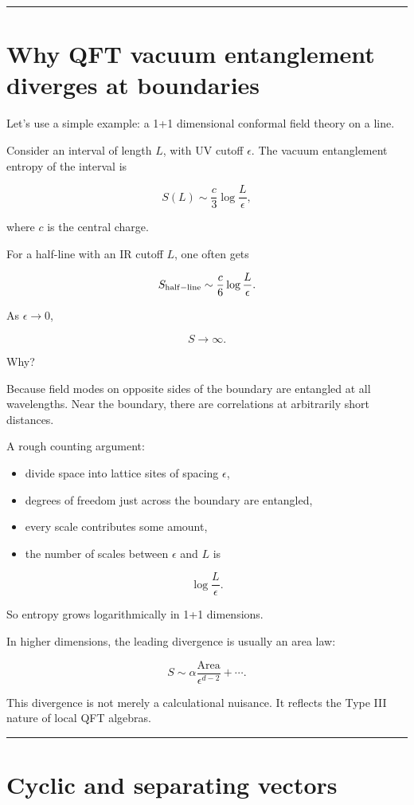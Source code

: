 \documentclass[11pt,a4paper]{article}
\begin{document}
\medskip\hrule\medskip

\section{Why QFT vacuum entanglement diverges at boundaries}

Let’s use a simple example: a 1+1 dimensional conformal field theory on a line.

Consider an interval of length $L$, with UV cutoff $\epsilon$. The vacuum entanglement entropy of the interval is

\[
S(L)\sim \frac{c}{3}\log\frac{L}{\epsilon},
\]

where $c$ is the central charge.

For a half-line with an IR cutoff $L$, one often gets

\[
S_{\rm half-line}\sim \frac{c}{6}\log\frac{L}{\epsilon}.
\]

As $\epsilon\to 0$,

\[
S\to \infty.
\]

Why?

Because field modes on opposite sides of the boundary are entangled at all wavelengths. Near the boundary, there are correlations at arbitrarily short distances.

A rough counting argument:

\begin{itemize}
  \item divide space into lattice sites of spacing $\epsilon$,
  \item degrees of freedom just across the boundary are entangled,
  \item every scale contributes some amount,
  \item the number of scales between $\epsilon$ and $L$ is
\end{itemize}

\[
\log\frac{L}{\epsilon}.
\]

So entropy grows logarithmically in 1+1 dimensions.

In higher dimensions, the leading divergence is usually an area law:

\[
S\sim \alpha \frac{\mathrm{Area}}{\epsilon^{d-2}}+\cdots.
\]

This divergence is not merely a calculational nuisance. It reflects the Type III nature of local QFT algebras.

\medskip\hrule\medskip

\section{Cyclic and separating vectors}
\end{document}
